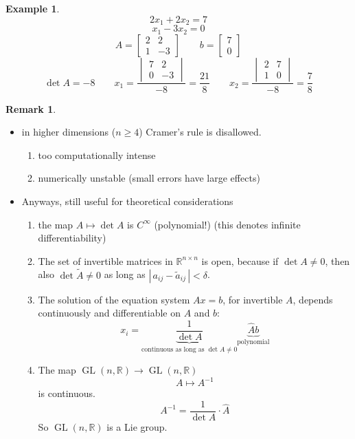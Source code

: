 \documentclass[a4paper,landscape,twocolumn]{article}
\newcommand\abs[1]{|\,#1\,|}
\theoremstyle{definition}
\newtheorem{ex}{Example}
\newtheorem{rem}{Remark}
\begin{document}
\begin{ex}
  \label{exercise-7.42}
  \[ 2x_1 + 2x_2 = 7 \]
  \[ x_1 - 3x_2 = 0 \]
  \[ A = \begin{bmatrix} 2 & 2 \\ 1 & -3 \end{bmatrix} \qquad b = \begin{bmatrix} 7 \\ 0 \end{bmatrix} \]
  \[
    \det{A} = -8 \qquad
    x_1 = \frac{\begin{vmatrix} 7 & 2 \\ 0 & -3 \end{vmatrix}}{-8} = \frac{21}{8} \qquad
    x_2 = \frac{\begin{vmatrix} 2 & 7 \\ 1 & 0 \end{vmatrix}}{-8} = \frac78
  \]
\end{ex}
\begin{rem}
  \label{bem-7.43}
  \begin{itemize}
    \item in higher dimensions ($n \geq 4$)
      Cramer's rule is disallowed.
      \begin{enumerate}
        \item too computationally intense
        \item numerically unstable (small errors have large effects)
      \end{enumerate}
    \item Anyways, still useful for theoretical considerations
      \begin{enumerate}
        \item the map $A \mapsto \det{A}$ is $C^\infty$ (polynomial!) (this denotes infinite differentiability)
        \item The set of invertible matrices in $\mathbb R^{n\times n}$ is open,
          because if $\det{A} \neq 0$, then also $\det{\tilde{A}} \neq 0$ as long as $\abs{a_{ij} - \tilde{a}_{ij}} < \delta$.
        \item The solution of the equation system $Ax = b$, for invertible $A$, depends continuously and differentiable
          on $A$ and $b$:
          \[
            x_i
            = \underbrace{\frac{1}{\det{A}}}_{\text{continuous as long as } \det{A} \neq 0} \underbrace{\hat{A} b}_{\text{polynomial}}
          \]
        \item The map $\operatorname{GL}(n,\mathbb R) \to \operatorname{GL}(n,\mathbb R)$
          \[ A \mapsto A^{-1} \]
          is continuous.
          \[ A^{-1} = \frac{1}{\det{A}} \cdot \hat{A} \]
          So $\operatorname{GL}(n,\mathbb R)$ is a Lie group.
      \end{enumerate}
  \end{itemize}
\end{rem}
\end{document}
